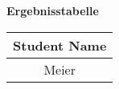 \begin{enumerate}
        \begin{table}[H]
            \centering
            \textbf{Ergebnisstabelle} \\ [3pt]
            \begin{tabular}{|c|}
                \hline
                \textbf{Student Name}\\
                \hline
                Meier \\
                \hline  
            \end{tabular}
        \end{table}

\end{enumerate}
